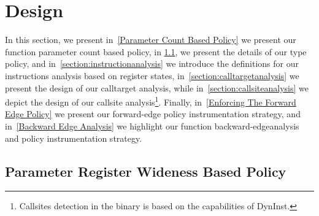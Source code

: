 \section{Design}
\label{chapter:Design}

In this section, we present 
in~\cref{Parameter Count Based Policy} we present our function parameter count based policy,
in \cref{section:typepolicy}, we present the details of our type policy, and 
in~\cref{section:instructionanalysis} we introduce the definitions for our instructions analysis based on register states,  
in~\cref{section:calltargetanalysis} we present the design of our calltarget analysis, while
in~\cref{section:callsiteanalysis} we depict the design of our callsite analysis\footnote{Callsites detection in the 
binary is based on the capabilities of DynInst.}.
Finally,  
in~\cref{Enforcing The Forward Edge Policy} we present our forward-edge policy instrumentation strategy, and 
in~\cref{Backward Edge Analysis} we highlight our function backward-edgeanalysis and policy instrumentation strategy.

\subsection{Parameter Register Wideness Based Policy}
\label{section:typepolicy}

